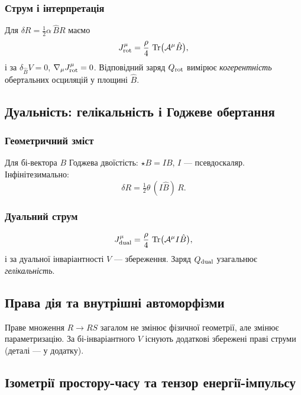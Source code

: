 \documentclass[11pt,a4paper]{article}
\numberwithin{equation}{section}
\theoremstyle{plain}
\theoremstyle{definition}
\theoremstyle{remark}
\DeclareMathOperator{\Tr}{Tr}
\begin{document}
\subsubsection{Струм і інтерпретація}

Для $\delta R=\tfrac{1}{2}\alpha\,\hat{B}R$ маємо
\begin{equation}
J^\mu_{\rm rot} = \frac{\rho}{4}\,\Tr\!\big(\mathcal{A}^\mu \hat{B}\big),
\label{eq:rotor-phase}
\end{equation}
і за $\delta_{\hat{B}}V=0$, $\nabla_\mu J^\mu_{\rm rot}=0$. Відповідний заряд $Q_{\rm rot}$ вимірює \emph{когерентність} обертальних осциляцій у площині $\hat{B}$.

\subsection{Дуальність: гелікальність і Годжеве обертання}

\subsubsection{Геометричний зміст}

Для бі-вектора $B$ Годжева двоїстість: $\star B=IB$, $I$ — псевдоскаляр. Інфінітезимально:
\begin{equation}
\delta R = \tfrac{1}{2}\theta\,(I\hat{B})\,R.
\end{equation}

\subsubsection{Дуальний струм}

\begin{equation}
J^\mu_{\rm dual} = \frac{\rho}{4}\,\Tr\!\big(\mathcal{A}^\mu I\hat{B}\big),
\label{eq:duality}
\end{equation}
і за дуальної інваріантності $V$ — збереження. Заряд $Q_{\rm dual}$ узагальнює \emph{гелікальність}.

\subsection{Права дія та внутрішні автоморфізми}

Праве множення $R\to RS$ загалом не змінює фізичної геометрії, але змінює параметризацію. За бі-інваріантного $V$ існують додаткові збережені праві струми (деталі — у додатку).

\subsection{Ізометрії простору-часу та тензор енергії-імпульсу}
\end{document}
